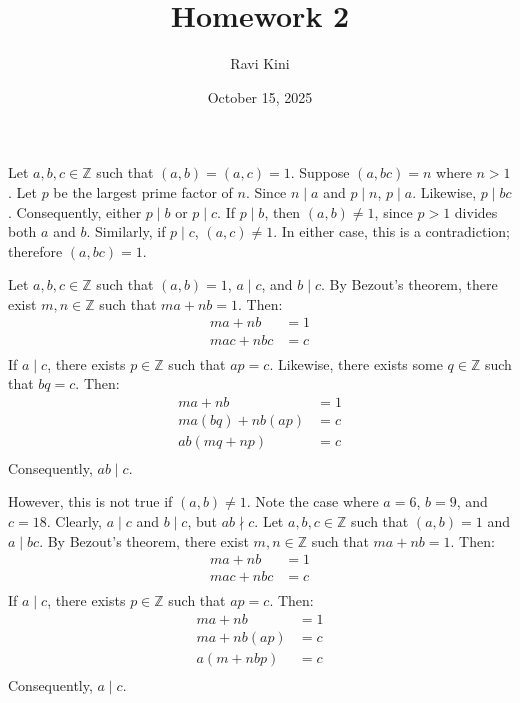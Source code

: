 \documentclass{article}
\title{Homework 2}
\author{Ravi Kini}
\date{October 15, 2025}
\begin{document}
\maketitle

\problem{}
Let $a, b, c \in \mathbb{Z}$ such that $(a, b) = (a, c) = 1$. Suppose $(a, bc) = n$ where $n > 1$. Let $p$ be the largest prime factor of $n$. Since $n \mid a$ and $p \mid n$, $p \mid a$. Likewise, $p \mid bc$. Consequently, either $p \mid b$ or $p \mid c$. If $p \mid b$, then $(a, b) \neq 1$, since $p > 1$ divides both $a$ and $b$. Similarly, if $p \mid c$, $(a, c) \neq 1$. In either case, this is a contradiction; therefore $(a, bc) = 1$.

\clearpage

\problem{}
Let $a, b, c \in \mathbb{Z}$ such that $(a, b) = 1$, $a \mid c$, and $b \mid c$. By Bezout's theorem, there exist $m, n \in \mathbb{Z}$ such that $ma + nb = 1$. Then:
\begin{align*}
    ma + nb & = 1 \\
    mac + nbc & = c \\
\end{align*}
If $a \mid c$, there exists $p \in \mathbb{Z}$ such that $ap = c$. Likewise, there exists some $q \in \mathbb{Z}$ such that $bq = c$. Then:
\begin{align*}
    ma + nb & = 1 \\
    ma(bq) + nb(ap) & = c \\
    ab(mq + np) & = c \\
\end{align*}
Consequently, $ab \mid c$.

However, this is not true if $(a, b) \neq 1$. Note the case where $a = 6$, $b = 9$, and $c = 18$. Clearly, $a \mid c$ and $b \mid c$, but $ab \nmid c$.
Let $a, b, c \in \mathbb{Z}$ such that $(a, b) = 1$ and $a \mid bc$. By Bezout's theorem, there exist $m, n \in \mathbb{Z}$ such that $ma + nb = 1$. Then:
\begin{align*}
    ma + nb & = 1 \\
    mac + nbc & = c \\
\end{align*}
If $a \mid c$, there exists $p \in \mathbb{Z}$ such that $ap = c$. Then:
\begin{align*}
    ma + nb & = 1 \\
    ma + nb(ap) & = c \\
    a(m + nbp) & = c \\
\end{align*}
Consequently, $a \mid c$.
\end{document}
